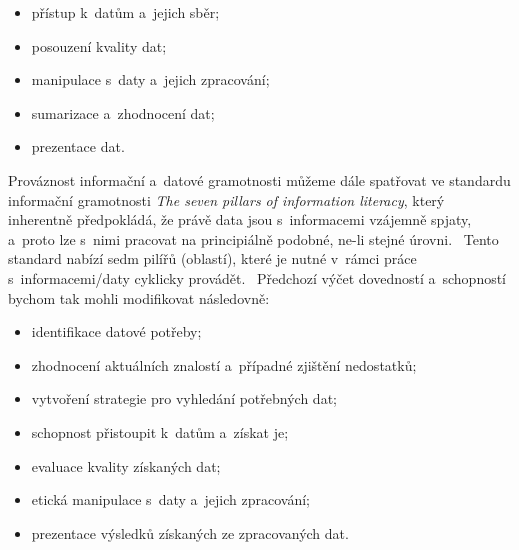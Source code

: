 \begin{itemize}
\tightlist
\item
  přístup k~datům a~jejich sběr;
\item
  posouzení kvality dat;
\item
  manipulace s~daty a~jejich zpracování;
\item
  sumarizace a~zhodnocení dat;
\item
  prezentace dat.
\end{itemize}

Prováznost informační a~datové gramotnosti můžeme dále spatřovat ve standardu informační gramotnosti \emph{The seven pillars of information literacy}, který inherentně předpokládá, že právě data jsou s~informacemi vzájemně spjaty, a~proto lze s~nimi pracovat na principiálně podobné, ne-li stejné úrovni.~\parencite[126]{calzada13} Tento standard nabízí sedm pilířů (oblastí), které je nutné v~rámci práce s~informacemi/daty cyklicky provádět.~\parencite{sconul11} Předchozí výčet dovedností a~schopností bychom tak mohli modifikovat následovně:

\begin{itemize}
\tightlist
\item
  identifikace datové potřeby;
\item
  zhodnocení aktuálních znalostí a~případné zjištění nedostatků;
\item
  vytvoření strategie pro vyhledání potřebných dat;
\item
  schopnost přistoupit k~datům a~získat je;
\item
  evaluace kvality získaných dat;
\item
  etická manipulace s~daty a~jejich zpracování;
\item
  prezentace výsledků získaných ze zpracovaných dat.
\end{itemize}
